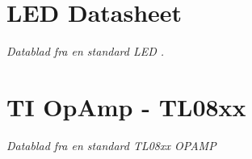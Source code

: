 \chapter[LED Datasheet]{LED Datasheet}
\label{paper-a}

\emph{Datablad fra en standard LED \cite{LEDdatasheet}.}

	\bigskip



\chapter[OpAmp - TL08xx]{TI OpAmp - TL08xx}
\label{paper-b}

\emph{Datablad fra en standard TL08xx OPAMP \cite{TI-TL08xx}}

\bigskip

